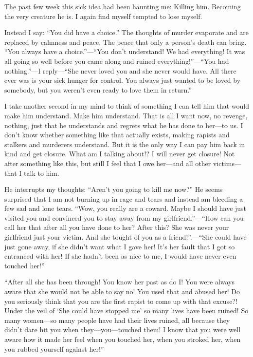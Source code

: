\documentclass{article}
\begin{document}
	\medskip
	
	The past few week this sick idea had been haunting me: Killing him. Becoming the very creature he is. I again find myself tempted to lose myself.
	
	\pagebreak
	Instead I say: \enquote{You did have a choice.} The thoughts of murder evaporate and are replaced by calmness and peace. The peace that only a person's death can bring. \enquote{You always have a choice.}—\enquote{You don't understand! We had everything! It was all going so well before you came along and ruined everything!}—\enquote{You had nothing.}—I reply—\enquote{She never loved you and she never would have. All there ever was is your sick hunger for control. You always just wanted to be loved by somebody, but you weren't even ready to love them in return.}
	
	\medskip
	
	I take another second in my mind to think of something I can tell him that would make him understand. Make him understand. That is all I want now, no revenge, nothing, just that he understands and regrets what he has done to her—to us. I don't know whether something like that actually exists, making rapists and stalkers and murderers understand. But it is the only way I can pay him back in kind and get closure. What am I talking about!? I will never get closure! Not after something like this, but still I feel that I owe her—and all other victims—that I talk to him.
	
	\medskip
	
	He interrupts my thoughts: \enquote{Aren't you going to kill me now?} He seems surprised that I am not burning up in rage and tears and instead am bleeding a few sad and lone tears. \enquote{Wow, you really are a coward. Maybe I should have just visited you and convinced you to stay  away from my girlfriend.}—\enquote{How can you call her that after all you have done to her? After this? She was never your girlfriend just your victim. And she tought of you as a friend!}.—\enquote{She could have just gone away, if she didn't want what I gave her! It's her fault that I got so entranced with her! If she hadn't been as nice to me, I would have never even touched her!}
	
	\medskip
	
	\enquote{After all she has been through! You know her past as do I! You were always aware that she would not be able to say no! You used that and abused her! Do you seriously think that you are the first rapist to come up with that excuse?! Under the veil of \enquote{She could have stopped me} so many lives have been ruined! So many women—so many people have had their lives ruined, all because they didn't dare hit you when they—you—touched them! I know that you were well aware how it made her feel when you touched her, when you stroked her, when you rubbed yourself against her!}
	
\end{document}
